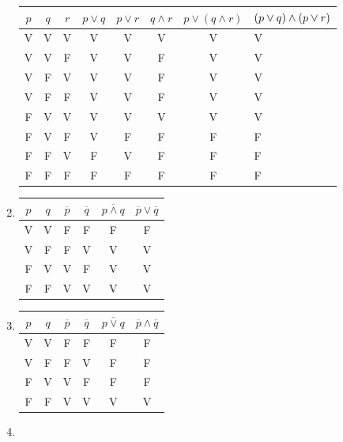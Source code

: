 \begin{exercice}
\begin{sol}
\begin{enumerate}
      \begin{tabularx}{\linewidth}{*{7}{c}>{\centering\arraybackslash}X}
        \toprule
        $p$ & $q$ & $r$ & $p \vee q$ & $p \vee r$ & $q \wedge r$ & $p \vee (q \wedge r)$ & $(p \vee q) \newline\wedge (p \vee r)$
        \\
        \midrule
        V & V & V & V & V & V & V & V \\
        V & V & F & V & V & F & V & V \\
        V & F & V & V & V & F & V & V \\
        V & F & F & V & V & F & V & V \\
        F & V & V & V & V & V & V & V \\
        F & V & F & V & F & F & F & F \\
        F & F & V & F & V & F & F & F \\
        F & F & F & F & F & F & F & F \\
        \bottomrule
      \end{tabularx}
    \item
      \begin{tabular}{*{6}{c}}
        \toprule
        $p$ & $q$ & $\overline{p}$ & $\overline{q}$ & $\overline{p \wedge q}$ & $\overline{p} \vee \overline{q}$ \\
        \midrule
        V & V & F & F & F & F \\
        V & F & F & V & V & V \\
        F & V & V & F & V & V \\
        F & F & V & V & V & V \\
        \bottomrule
      \end{tabular}
    \item
      \begin{tabular}{*{6}{c}}
        \toprule
        $p$ & $q$ & $\overline{p}$ & $\overline{q}$ & $\overline{p \vee q}$ & $\overline{p} \wedge \overline{q}$ \\
        \midrule
        V & V & F & F & F & F \\
        V & F & F & V & F & F \\
        F & V & V & F & F & F \\
        F & F & V & V & V & V \\
        \bottomrule
      \end{tabular}
    \item
      \begin{tabularx}{\linewidth}{*{6}{c}>{\centering\arraybackslash}X>{\centering\arraybackslash}X}

\end{tabularx}
\end{enumerate}
\end{sol}
\end{exercice}
